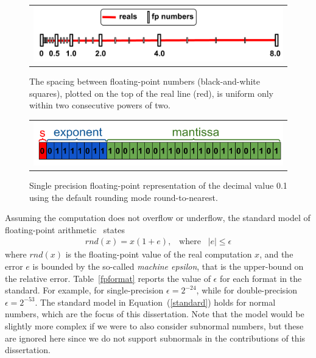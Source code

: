 %
\begin{figure}[t!]
	\centering
	\begin{tabular}{l}
		\includegraphics[width=1.0\textwidth]{pic/fpnumbers.png}
	\end{tabular}
	\caption{The spacing between floating-point numbers (black-and-white squares), plotted on the top of the real line (red), is uniform only within two consecutive powers of two.}
	\label{fig:line}
\end{figure}
%
\begin{figure}[b!]
	\centering
	\begin{tabular}{l}
		\includegraphics[width=1.0\textwidth]{pic/examplenumber.png}
	\end{tabular}
	\caption{Single precision floating-point representation of the decimal value 0.1 using the default rounding mode round-to-nearest.}
	\label{fig:zeropointone}
\end{figure}
%

Assuming the computation does not overflow or underflow, the standard model of floating-point arithmetic~\cite{every} states
%
\begin{align}
rnd(x)=x(1+e),\;\;\;\text{where}\;\;\;|e|\leq\epsilon
\label{standard}
\end{align}
%
where $rnd(x)$ is the floating-point value of the real computation $x$, and the error $e$ is bounded by the so-called \emph{machine epsilon}, that is the upper-bound on the relative error.
%
Table~\ref{fpformat} reports the value of $\epsilon$ for each format in the standard.
%
For example, for single-precision $\epsilon=2^{-24}$, while for double-precision $\epsilon=2^{-53}$.
%
The standard model in Equation~(\ref{standard}) holds for normal numbers, which are the focus of this dissertation.
%
Note that the model would be slightly more complex if we were to also consider subnormal numbers, but these are ignored here since we do not support subnormals in the contributions of this dissertation.
%

